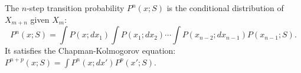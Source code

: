 The $n$-step transition probability $P^n(x; S)$ is the conditional distribution of $X_{m+n}$ given $X_m$:
$$P^n(x; S) = \int P(x; dx_1) \int P(x_1; dx_2) \cdots \int P(x_{n-2}; dx_{n-1}) P(x_{n-1}; S).$$
It satisfies the Chapman-Kolmogorov equation: $P^{n+p}(x; S) = \int P^n(x; dx') P^p(x'; S)$.
